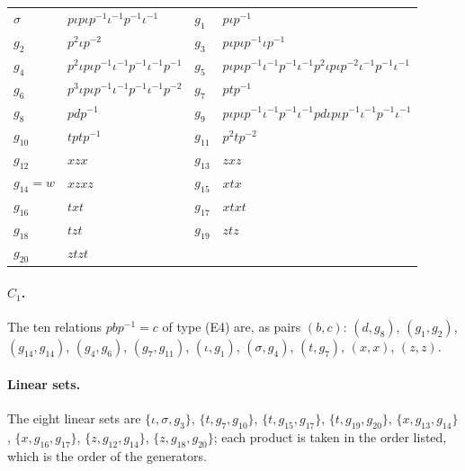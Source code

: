 \begin{center}\small
\begin{tabular}{@{}ll@{\qquad}ll@{}}
\toprule
$\sigma$ & $p\iota p\iota p^{-1}\iota^{-1} p^{-1}\iota^{-1}$ & $g_{1}$ & $p\iota p^{-1}$ \\
$g_{2}$ & $p^{2}\iota p^{-2}$ & $g_{3}$ & $p\iota p\iota p^{-1}\iota p^{-1}$ \\
$g_{4}$ & $p^{2}\iota p\iota p^{-1}\iota^{-1} p^{-1}\iota^{-1} p^{-1}$ & $g_{5}$ & $p\iota p\iota p^{-1}\iota^{-1} p^{-1}\iota^{-1} p^{2}\iota p\iota p^{-2}\iota^{-1} p^{-1}\iota^{-1}$ \\
$g_{6}$ & $p^{3}\iota p\iota p^{-1}\iota^{-1} p^{-1}\iota^{-1} p^{-2}$ & $g_{7}$ & $ptp^{-1}$ \\
$g_{8}$ & $pdp^{-1}$ & $g_{9}$ & $p\iota p\iota p^{-1}\iota^{-1} p^{-1}\iota^{-1} pd\iota p\iota p^{-1}\iota^{-1} p^{-1}\iota^{-1}$ \\
$g_{10}$ & $tptp^{-1}$ & $g_{11}$ & $p^{2}tp^{-2}$ \\
$g_{12}$ & $xzx$ & $g_{13}$ & $zxz$ \\
$g_{14}=w$ & $xzxz$ & $g_{15}$ & $xtx$ \\
$g_{16}$ & $txt$ & $g_{17}$ & $xtxt$ \\
$g_{18}$ & $tzt$ & $g_{19}$ & $ztz$ \\
$g_{20}$ & $ztzt$ & & \\
\bottomrule
\end{tabular}
\captionsetup{hypcap=false}%
\label{cert:tab-gens}
\end{center}

\paragraph{$C_1$.} The ten relations $pbp^{-1}=c$ of type (E4) are, as pairs $(b,c)$: $(d,g_{8})$, $(g_{1},g_{2})$, $(g_{14},g_{14})$,
$(g_{4},g_{6})$, $(g_{7},g_{11})$, $(\iota,g_{1})$, $(\sigma,g_{4})$, $(t,g_{7})$, $(x,x)$, $(z,z)$.

\paragraph{Linear sets.} The eight linear sets are $\{\iota,\sigma,g_{3}\}$, $\{t,g_{7},g_{10}\}$, $\{t,g_{15},g_{17}\}$,
$\{t,g_{19},g_{20}\}$, $\{x,g_{13},g_{14}\}$, $\{x,g_{16},g_{17}\}$, $\{z,g_{12},g_{14}\}$, $\{z,g_{18},g_{20}\}$; each product is taken in
the order listed, which is the order of the generators.

